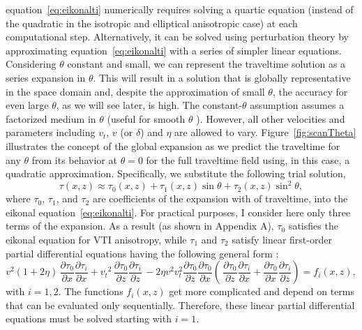  equation~\ref{eq:eikonalti}  numerically requires
 solving a quartic equation (instead of the quadratic in the isotropic and elliptical
anisotropic case) at each computational step. Alternatively, it  can be solved using perturbation theory \cite[]{Bender}
by approximating equation~\ref{eq:eikonalti} with a series of simpler linear equations. Considering $\theta$
constant and small, we can represent the traveltime solution as a series expansion in $\theta$. This will result in a solution that is globally representative in the
space domain and, despite the approximation of small $\theta$, 
the accuracy for even large $\theta$, as we will see later, is high. The constant-$\theta$ assumption
assumes a factorized medium \cite[]{alkhalifah:1139}
 in $\theta$ (useful for smooth $\theta$ ). However,
all other velocities and parameters including $v_t$, $v$ (or $\delta$) and $\eta$ are allowed to vary.
Figure~\ref{fig:scanTheta} illustrates
the concept of the global expansion as we predict the traveltime for
any $\theta$ from its behavior at $\theta=0$ for the full traveltime
field
using, in this case, a quadratic approximation. Specifically, we
 substitute the following trial solution,
\begin{equation}
 \tau(x,z) \approx \tau_0(x,z) +\tau_1(x,z) \sin\theta+ \tau_2(x,z)  \sin^{2}\theta,
\label{eqn:n0e}
\end{equation}
where $\tau_0$,  $\tau_1$, and $\tau_2$ are coefficients of the
expansion with   of traveltime, into the eikonal equation~\ref{eq:eikonalti}.
For practical purposes, I consider here only three terms of the expansion. 
As a result  (as shown in Appendix A), $\tau_0$ satisfies the eikonal equation for VTI anisotropy, while $\tau_1$ and $\tau_2$
 satisfy linear first-order partial differential equations having  the following general form :
\begin{equation}
{v^2} (1+2 \eta) \,{\frac{\partial \tau_{0}}{\partial x}  \frac{\partial \tau_{i}}{\partial x}  } + 
    {{{v_t}}^2}\,{\frac{\partial \tau_{0}}{\partial z}  \frac{\partial \tau_{i}}{\partial z}}\,
     - 2 \eta {v^2} {v_{t}^2} \frac{\partial \tau_{0}}{\partial z} \frac{\partial \tau_{0}}{\partial x}  
     \left( \,{ \frac{\partial \tau_{0}}{\partial z}  \frac{\partial \tau_{i}}{\partial x}} +
    { \frac{\partial \tau_{0}}{\partial x}  \frac{\partial \tau_{i}}{\partial z}} \right) =
f_i(x,z),
\label{eqn:allorder}
\end{equation}
with $i=1,2$. The functions $f_i(x,z)$ get more complicated   and depend on terms that can be evaluated 
only sequentially. Therefore, these linear partial differential equations must be solved   starting with $i=1$. 

